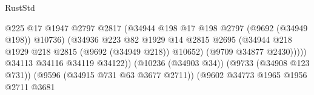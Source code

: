 \begin{lexlean}{RustStd}
\begin{coremodule}
                                                          @225
                                                          @17
                                                          @1947
                                                          @2797
                                                          @2817
                                                          (@34944
                                                            @198
                                                            @17
                                                            @198
                                                            @2797
                                                            (@9692 (@34949 @198))
                                                            @10736)
                                                          (@34936
                                                            @223
                                                            @82
                                                            @1929
                                                            @14
                                                            @2815
                                                            @2695
                                                            (@34944
                                                              @218
                                                              @1929
                                                              @218
                                                              @2815
                                                              (@9692 (@34949 @218))
                                                              @10652)
                                                            (@9709 @34877 @2430)))))
                                                    @34113
                                                    @34116
                                                    @34119
                                                    @34122))
                                                (@10236 (@34903 @34))
                                                (@9733 (@34908 @123 @731))
                                                (@9596 (@34915 @731 @63 @3677 @2711))
                                                (@9602
                                                  @34773
                                                  @1965
                                                  @1956
                                                  @2711
                                                  @3681

\end{coremodule}
\end{lexlean}
